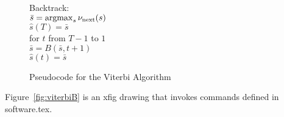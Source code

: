 \documentclass[prelim,showlabels]{book}
\newcommand{\argmax}{\operatorname*{argmax}}
\newcommand{\ti}[2]{{#1}{(#2)}}                  %
\begin{document}
\begin{figure}[htbp]
\begin{center}
{\begin{minipage}{0.90\textwidth}
\begin{tabbing}
          \< \- \< \- \< \- %
          Backtrack: \> \+ \\
          $\bar s = \argmax_s \nu\tnext(s)$ \\
          $\ti{\hat s}{T}  = \bar s$ \\
          for $t$ from $T-1$ to $1$  \\ \> \+
          $ \bar s = B(\bar s,t+1)$  \\
          $\ti{\hat s}{t} = \bar s$
        \end{tabbing}
      \end{minipage}
    }
    \caption[Pseudocode for the Viterbi Algorithm]%
    {Pseudocode for the Viterbi Algorithm}
    \label{fig:viterbi}
  \end{center}
\end{figure}
Figure~\ref{fig:viterbiB} is an xfig drawing that invokes commands
defined in software.tex.
\end{document}
